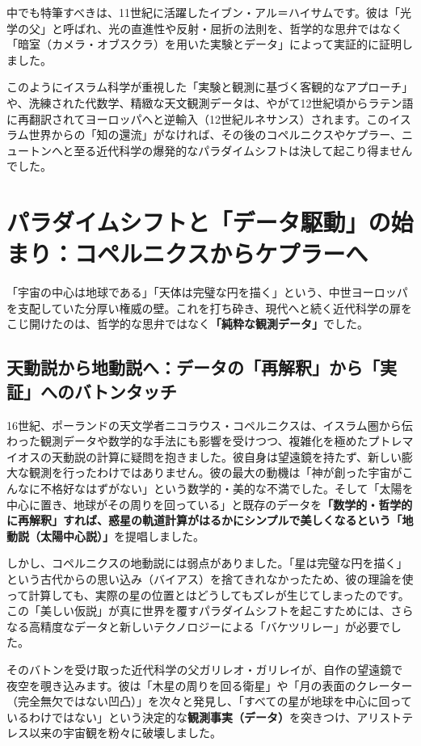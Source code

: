 中でも特筆すべきは、11世紀に活躍したイブン・アル＝ハイサムです。彼は「光学の父」と呼ばれ、光の直進性や反射・屈折の法則を、哲学的な思弁ではなく「暗室（カメラ・オブスクラ）を用いた実験とデータ」によって実証的に証明しました。

このようにイスラム科学が重視した「実験と観測に基づく客観的なアプローチ」や、洗練された代数学、精緻な天文観測データは、やがて12世紀頃からラテン語に再翻訳されてヨーロッパへと逆輸入（12世紀ルネサンス）されます。このイスラム世界からの「知の還流」がなければ、その後のコペルニクスやケプラー、ニュートンへと至る近代科学の爆発的なパラダイムシフトは決して起こり得ませんでした。

\section{パラダイムシフトと「データ駆動」の始まり：コペルニクスからケプラーへ}

「宇宙の中心は地球である」「天体は完璧な円を描く」という、中世ヨーロッパを支配していた分厚い権威の壁。これを打ち砕き、現代へと続く近代科学の扉をこじ開けたのは、哲学的な思弁ではなく\textbf{「純粋な観測データ」}でした。

\subsection{天動説から地動説へ：データの「再解釈」から「実証」へのバトンタッチ}

16世紀、ポーランドの天文学者ニコラウス・コペルニクスは、イスラム圏から伝わった観測データや数学的な手法にも影響を受けつつ、複雑化を極めたプトレマイオスの天動説の計算に疑問を抱きました。彼自身は望遠鏡を持たず、新しい膨大な観測を行ったわけではありません。彼の最大の動機は「神が創った宇宙がこんなに不格好なはずがない」という数学的・美的な不満でした。そして「太陽を中心に置き、地球がその周りを回っている」と既存のデータを\textbf{「数学的・哲学的に再解釈」すれば、惑星の軌道計算がはるかにシンプルで美しくなるという「地動説（太陽中心説）」}を提唱しました。

しかし、コペルニクスの地動説には弱点がありました。「星は完璧な円を描く」という古代からの思い込み（バイアス）を捨てきれなかったため、彼の理論を使って計算しても、実際の星の位置とはどうしてもズレが生じてしまったのです。この「美しい仮説」が真に世界を覆すパラダイムシフトを起こすためには、さらなる高精度なデータと新しいテクノロジーによる「バケツリレー」が必要でした。

そのバトンを受け取った近代科学の父ガリレオ・ガリレイが、自作の望遠鏡で夜空を覗き込みます。彼は「木星の周りを回る衛星」や「月の表面のクレーター（完全無欠ではない凹凸）」を次々と発見し、「すべての星が地球を中心に回っているわけではない」という決定的な\textbf{観測事実（データ）}を突きつけ、アリストテレス以来の宇宙観を粉々に破壊しました。

